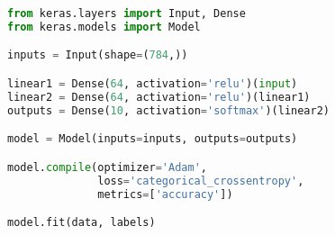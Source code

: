 \begin{lstlisting}[float={ht},caption={This is an example listing.},label={lst:one},language=Python,upquote=true]
from keras.layers import Input, Dense
from keras.models import Model

inputs = Input(shape=(784,))

linear1 = Dense(64, activation='relu')(input)
linear2 = Dense(64, activation='relu')(linear1)
outputs = Dense(10, activation='softmax')(linear2)

model = Model(inputs=inputs, outputs=outputs)

model.compile(optimizer='Adam',
              loss='categorical_crossentropy',
              metrics=['accuracy'])

model.fit(data, labels)
\end{lstlisting}